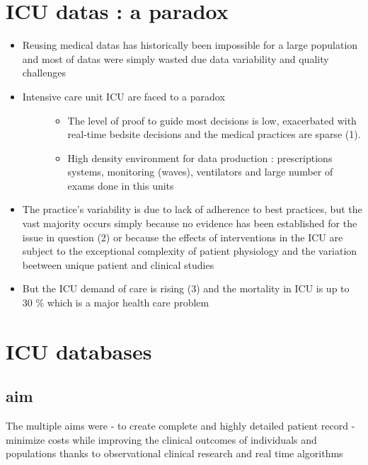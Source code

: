 \section{ICU datas : a paradox}\label{icu-datas-a-paradox}

\begin{itemize}
\item
  Reusing medical datas has historically been impossible for a large
  population and most of datas were simply wasted due data variability
  and quality challenges
\item
  \begin{description}
  \item[Intensive care unit ICU are faced to a paradox]
  \begin{itemize}
  \tightlist
  \item
    The level of proof to guide most decisions is low, exacerbated with
    real-time bedsite decisions and the medical practices are sparse
    (1).
  \item
    High density environment for data production : prescriptions
    systems, monitoring (waves), ventilators and large number of exams
    done in this units
  \end{itemize}
  \end{description}
\item
  The practice's variability is due to lack of adherence to best
  practices, but the vast majority occurs simply because no evidence has
  been established for the issue in question (2) or because the effects
  of interventions in the ICU are subject to the exceptional complexity
  of patient physiology and the variation beetween unique patient and
  clinical studies
\item
  But the ICU demand of care is rising (3) and the mortality in ICU is
  up to 30 \% which is a major health care problem
\end{itemize}

\section{ICU databases}\label{icu-databases}

\subsection{aim}\label{aim}

The multiple aims were - to create complete and highly detailed patient
record - minimize costs while improving the clinical outcomes of
individuals and populations thanks to observational clinical research
and real time algorithms

